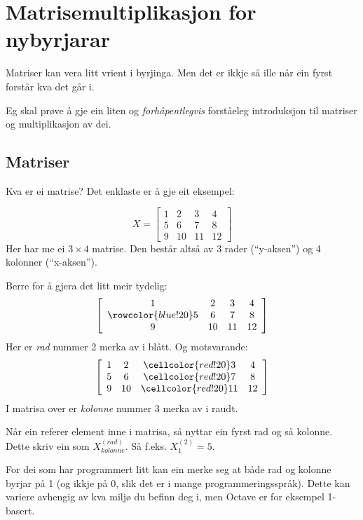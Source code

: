 \documentclass[12pt]{article}
\newcommand\x{\times}
\begin{document}
\section*{Matrisemultiplikasjon for nybyrjarar}

Matriser kan vera litt vrient i byrjinga.
Men det er ikkje så ille når ein fyrst forstår kva det går i.

Eg skal prøve å gje ein liten og \emph{forhåpentlegvis}
forståeleg intro\-duksjon til matriser og multiplikasjon av dei.

\subsection*{Matriser}

Kva er ei matrise? Det enklaste er å gje eit eksempel:

\begin{equation*}
X = \begin{bmatrix}
1 & 2 & 3 & 4 \\
5 & 6 & 7 & 8 \\
9 & 10 & 11 & 12
\end{bmatrix}
\end{equation*}
Her har me ei $3 \x 4$ matrise. 
Den består altså av 3 rader (``y-aksen'') og 4 kolonner (``x-aksen'').

Berre for å gjera det litt meir tydelig:
\begin{equation*}
\left[\begin{array}{cccc}
1 & 2 & 3 & 4 \\
\rowcolor{blue!20} 5 & 6 & 7 & 8 \\
9 & 10 & 11 & 12
\end{array}\right]
\end{equation*}
Her er \emph{rad} nummer 2 merka av i blått. Og motsvarande:
\begin{equation*}
\left[\begin{array}{cccc}
1 & 2 & \cellcolor{red!20} 3 & 4 \\
5 & 6 & \cellcolor{red!20} 7 & 8 \\
9 & 10 & \cellcolor{red!20} 11 & 12
\end{array}\right]
\end{equation*}
I matrisa over er \emph{kolonne} nummer 3 merka av i raudt.

Når ein referer element inne i matrisa, så nyttar ein fyrst rad og så kolonne.
Dette skriv ein som $X^{(rad)}_{kolonne}$.
Så f.eks. $X^{(2)}_1 = 5$.

For dei som har programmert litt kan ein merke seg at både rad og kolonne byrjar
på 1 (og ikkje på 0, slik det er i mange programmeringsspråk). Dette kan
variere avhengig av kva miljø du befinn deg i, men Octave er for eksempel 1-basert.
\end{document}
